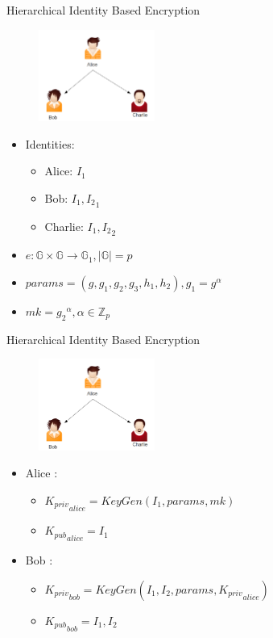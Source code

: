\documentclass{beamer}
\begin{document}
\begin{frame}{Hierarchical Identity Based Encryption}
\begin{figure}
\includegraphics[height=3cm]{img/img3.png} 
\end{figure}
\pause \begin{itemize}
\item Identities:
 \begin{itemize}
	\item Alice: $I_1$
	\item Bob: $I_1,{I_2}_1$
	\item Charlie: $I_1,{I_2}_2$
\end{itemize}
\pause \item $e : \mathbb{G} \times \mathbb{G} \to \mathbb{G}_1 , |\mathbb{G}| = p$
\pause \item $params = (g, g_1, g_2, g_3, h_1, h_2) ,  g_1 = g^\alpha$
\pause \item $mk = {g_2}^\alpha , \alpha \in \mathbb{Z}_p$
\end{itemize}
\end{frame}

\begin{frame}{Hierarchical Identity Based Encryption}
\begin{figure}
\includegraphics[height=3cm]{img/img3.png} 
\end{figure}

\begin{itemize}
\item Alice :
\begin{itemize}
\item ${K_{priv}}_{alice} = KeyGen(I_1, params, mk)$ 
\item ${K_{pub}}_{alice} = I_1$
\end{itemize}

\item Bob :
\begin{itemize}
\item ${K_{priv}}_{bob} = KeyGen(I_1, I_2, params, {K_{priv}}_{alice})$
\item ${K_{pub}}_{bob} = I_1, I_2$
\end{itemize}

\end{itemize}
\end{frame}
\end{document}

